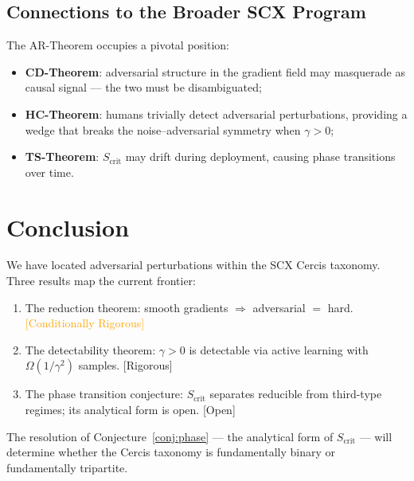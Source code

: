 \documentclass[12pt,a4paper]{article}
\newcommand{\rigorous}{\textcolor{green!50!black}{\small\textsf{[Rigorous]}}}
\newcommand{\conditionallyrigorous}{\textcolor{orange}{\small\textsf{[Conditionally Rigorous]}}}
\newcommand{\openquest}{\textcolor{red!70!black}{\small\textsf{[Open]}}}
\begin{document}
\subsection{Connections to the Broader SCX Program}

The AR-Theorem occupies a pivotal position:
\begin{itemize}
    \item \textbf{CD-Theorem}: adversarial structure in the gradient field
          may masquerade as causal signal --- the two must be disambiguated;
    \item \textbf{HC-Theorem}: humans trivially detect adversarial
          perturbations, providing a wedge that breaks the
          noise--adversarial symmetry when $\gamma > 0$;
    \item \textbf{TS-Theorem}: $S_{\mathrm{crit}}$ may drift during
          deployment, causing phase transitions over time.
\end{itemize}

\section{Conclusion}

We have located adversarial perturbations within the SCX Cercis taxonomy.
Three results map the current frontier:
\begin{enumerate}[label=(\arabic*)]
    \item The reduction theorem: smooth gradients $\Rightarrow$ adversarial
          $=$ hard.  \conditionallyrigorous
    \item The detectability theorem: $\gamma > 0$ is detectable via active
          learning with $\Omega(1/\gamma^2)$ samples.  \rigorous
    \item The phase transition conjecture: $S_{\mathrm{crit}}$ separates
          reducible from third-type regimes; its analytical form is open.
          \openquest
\end{enumerate}

The resolution of Conjecture~\ref{conj:phase} --- the analytical form of
$S_{\mathrm{crit}}$ --- will determine whether the Cercis taxonomy is
fundamentally binary or fundamentally tripartite.
\end{document}
